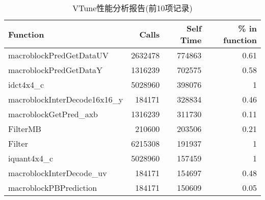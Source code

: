 \begin{table}[htbp]
  \centering
  \caption{VTune性能分析报告(前10项记录)}
  \label{tab:vtune10}
    \begin{tabular}{lrrr}
    \addlinespace
    \toprule[1.5pt]
    \textbf{Function} & \textbf{Calls} & \textbf{Self Time} & \textbf{\% in function} \\
    \midrule[1pt]
    macroblockPredGetDataUV & 2632478 & 774863 & 0.61 \\
    macroblockPredGetDataY & 1316239 & 702575 & 0.58 \\
    idct4x4\_c & 5028960 & 398076 & 1 \\
    macroblockInterDecode16x16\_y & 184171 & 328834 & 0.46 \\
    macroblockGetPred\_axb & 1316239 & 311730 & 0.11 \\
    FilterMB & 210600 & 203506 & 0.21 \\
    Filter & 6215308 & 191937 & 1 \\
    iquant4x4\_c & 5028960 & 157459 & 1 \\
    macroblockInterDecode\_uv & 184171 & 154697 & 0.48 \\
    macroblockPBPrediction & 184171 & 150609 & 0.05 \\
    \bottomrule[1.5pt]
    \end{tabular}
\end{table}
